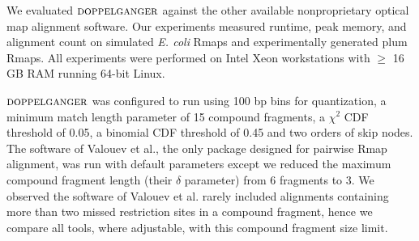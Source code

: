 \label{sec-results}


We evaluated $\mbox{\rm {\sc doppelganger}}$ against the other available nonproprietary optical map alignment software.
Our experiments measured runtime, peak memory, and  alignment count on simulated {\em E. coli} Rmaps and experimentally generated plum Rmaps.  All experiments were performed on Intel Xeon workstations with $\ge$ 16 GB RAM running 64-bit Linux.

$\mbox{\rm {\sc doppelganger}}$ was configured to run using 100 bp bins for quantization, a minimum match length parameter of 15 compound fragments, a $\chi^2$ CDF threshold of 0.05, a binomial CDF threshold of 0.45 and two orders of skip nodes.
The software of Valouev et al., the only package designed for pairwise Rmap alignment, was run with default parameters except we reduced the maximum compound fragment length (their $\delta$ parameter) from 6 fragments to 3. We observed the software of Valouev et al. rarely included alignments containing more than two missed restriction sites in a compound fragment, hence we compare all tools, where adjustable, with this compound fragment size limit.

